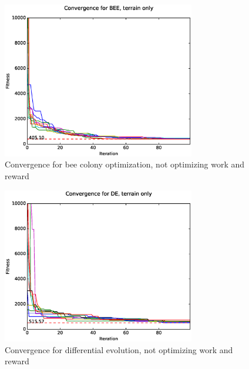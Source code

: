 \documentclass{tamuccthesis}
\begin{document}
\begin{figure}
    \captionsetup{justification=centering}
    \centering
        \includegraphics[width=0.75\textwidth,trim={0cm 0.75cm 0cm 0.75cm},clip]{conv_BEE_a.eps}
    \caption[]{Convergence for bee colony optimization, not optimizing work and reward}
    \label{fig:convergence_a_BEE}
\end{figure}

\begin{figure}
    \captionsetup{justification=centering}
    \centering
        \includegraphics[width=0.75\textwidth,trim={0cm 0.75cm 0cm 0.75cm},clip]{conv_DE_a.eps}
    \caption{Convergence for differential evolution, not optimizing work and reward}
    \label{fig:convergence_a_DE}
\end{figure}
\end{document}
